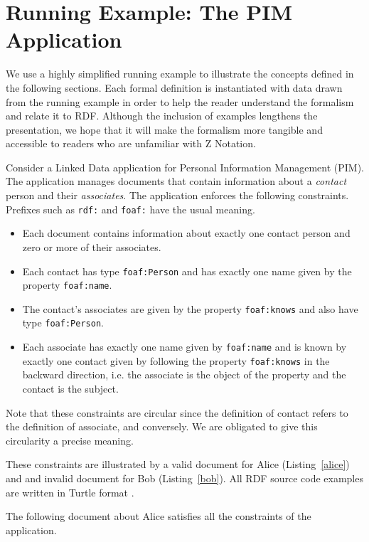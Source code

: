 \documentclass{article}
\begin{document}
\section{Running Example: The PIM Application}
\label{sec-pim}
We use a highly simplified running example to illustrate the concepts defined in the following sections.
Each formal definition is instantiated with data drawn from the running example in order to help the reader understand the
formalism and relate it to RDF.
Although the inclusion of examples lengthens the presentation, we hope that it will make the formalism more tangible and accessible
to readers who are unfamiliar with Z Notation.

Consider a Linked Data \cite{tbl:ld} application for Personal Information Management (PIM).
The application manages documents that contain information about a {\em contact} person and their {\em associates}.
The application enforces the following constraints.
Prefixes such as {\tt rdf:}\cite{w3c:rdf11} and {\tt foaf:}\cite{foaf:spec} have the usual meaning.
\begin{itemize}
\item Each document contains information about exactly one contact person and zero or more of their associates.
\item Each contact has type {\tt foaf:Person} and has exactly one name given by the property {\tt foaf:name}.
\item The contact's associates are given by the property {\tt foaf:knows} and also have type {\tt foaf:Person}.
\item Each associate has exactly one name given by {\tt foaf:name}
and is known by exactly one contact given by following the property {\tt foaf:knows} in the backward direction, i.e. the associate is the object
of the property and the contact is the subject.
\end{itemize}

Note that these constraints are circular since the definition of contact refers to the definition of associate, and conversely.
We are obligated to give this circularity a precise meaning.

These constraints are illustrated by a valid document for Alice (Listing~\ref{alice}) and and invalid document for Bob (Listing~\ref{bob}).
All RDF source code examples are written in Turtle format \cite{w3c:turtle11}.

The following document about Alice satisfies all the constraints of the application.

\end{document}
